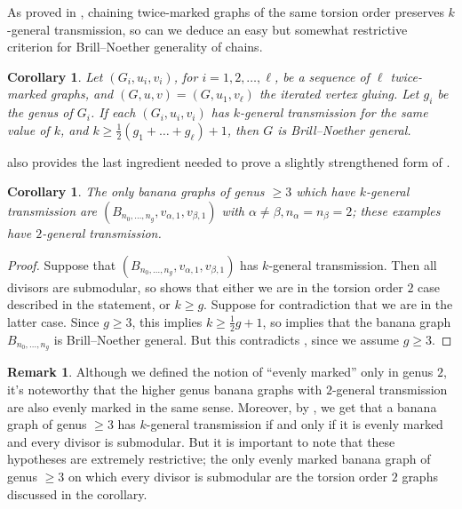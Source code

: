 \documentclass[11pt]{article}
\newtheorem{coro}[theo]{Corollary}
\theoremstyle{definition}
\newtheorem{rema}[theo]{Remark}
\numberwithin{equation}{section}
\begin{document}
As proved in \cite[Theorem A]{Pfl22}, chaining twice-marked graphs of the same torsion order preserves $k$-general transmission, so can we deduce an easy but somewhat restrictive criterion for Brill--Noether generality of chains.

\begin{coro}
Let $(G_i, u_i, v_i)$, for $i=1,2, \ldots, \ell$, be a sequence of $\ell$ twice-marked graphs, and $(G,u,v) = (G,u_1, v_\ell)$ the iterated vertex gluing. Let $g_i$ be the genus of $G_i$. If each $(G_i,u_i,v_i)$ has $k$-general transmission for the same value of $k$, and $k \geq \frac12 (g_1 + \ldots + g_\ell) + 1$, then $G$ is Brill--Noether general.
\end{coro}

 also provides the last ingredient needed to prove a slightly strengthened form of .

\begin{coro} \label{cor:bananasWithKGT}
    The only banana graphs of genus $\geq 3$ which have $k$-general transmission are $(B_{n_0, \ldots, n_g},v_{\alpha,1},v_{\beta,1})$ with $\alpha \neq \beta, n_\alpha = n_\beta = 2$; these examples have $2$-general transmission.
\end{coro}

\begin{proof}
Suppose that $(B_{n_0, \ldots, n_g},v_{\alpha,1},v_{\beta,1})$ has $k$-general transmission. Then all divisors are submodular, so
 shows that either we are in the torsion order $2$ case described in the statement, or $k \geq g$. Suppose for contradiction that we are in the latter case. Since $g \geq 3$, this implies $k \geq \frac12 g + 1$, so  implies that the banana graph $B_{n_0, \ldots, n_g}$ is Brill--Noether general. But  this contradicts , since we assume $g \geq 3$.
\end{proof}

\begin{rema}
    Although we defined the notion of ``evenly marked'' only in genus $2$, it's noteworthy that the higher genus banana graphs with $2$-general transmission are also evenly marked in the same sense. Moreover, by , we get that a banana graph of genus $\geq 3$ has $k$-general transmission if and only if it is evenly marked and every divisor is submodular. But it is important to note that these hypotheses are extremely restrictive; the only evenly marked banana graph of genus $\geq 3$ on which every divisor is submodular are the torsion order $2$ graphs discussed in the corollary.
\end{rema}
\end{document}
